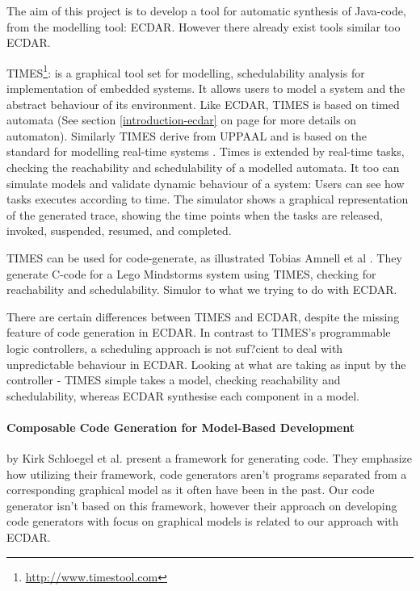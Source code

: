 The aim of this project is to develop a tool for automatic synthesis of Java-code, from the modelling tool: ECDAR. However there already exist tools similar too ECDAR.

TIMES\footnote{\url{http://www.timestool.com}}: is a graphical tool set for modelling, schedulability analysis for implementation of embedded systems. It allows users to model a system and the abstract behaviour of its environment. 
Like ECDAR, TIMES is based on timed automata (See section \ref{introduction-ecdar} on page \pageref{introduction-ecdar} for more details on automaton). Similarly TIMES derive from UPPAAL and is based on the standard for modelling real-time systems \cite{Alur1994:183}.
Times is extended by real-time tasks, checking the reachability and schedulability of a modelled automata. It too can simulate models and validate dynamic behaviour of a system: Users can see how tasks executes according to time. The simulator shows a graphical representation of the generated trace, showing the time points when the tasks are released, invoked, suspended, resumed, and completed.

TIMES can be used for code-generate, as illustrated Tobias Amnell et al \cite{Amnell:2002:CST:779110.779112}. They generate C-code for a Lego Mindstorms system using TIMES, checking for reachability and schedulability. Simulor to what we trying to do with ECDAR. 

There are certain differences between TIMES and ECDAR, despite the missing feature of code generation in ECDAR. In contrast to TIMES's programmable logic controllers, a scheduling approach is not suf?cient to deal with unpredictable behaviour in ECDAR.
Looking at what are taking as input by the controller - TIMES simple takes a model, checking reachability and schedulability, whereas ECDAR synthesise each component in a model.



\paragraph{Composable Code Generation for Model-Based Development}
by Kirk Schloegel et al. present a framework for generating
code\cite{composable-code-generation}. They emphasize how utilizing their
framework, code generators aren't programs separated from a corresponding
graphical model as it often have been in the past. Our code generator isn't
based on this framework, however their approach on developing code generators
with focus on graphical models is related to our approach with ECDAR.

